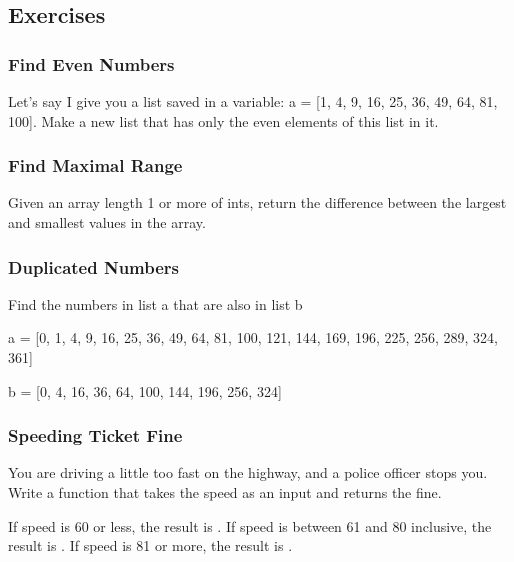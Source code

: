 \documentclass[letterpaper,10pt,english]{sphinxmanual}
\begin{document}
\begin{sphinxVerbatim}
\end{sphinxVerbatim}


\subsection{Exercises}
\label{\detokenize{content/Introduction_to_Programming:exercises}}

\subsubsection{Find Even Numbers}
\label{\detokenize{content/Introduction_to_Programming:find-even-numbers}}
Let’s say I give you a list saved in a variable: a = {[}1, 4, 9, 16, 25, 36, 49, 64, 81, 100{]}. Make a new list that has only the even elements of this list in it.


\subsubsection{Find Maximal Range}
\label{\detokenize{content/Introduction_to_Programming:find-maximal-range}}
Given an array length 1 or more of ints, return the difference between the largest and smallest values in the array.


\subsubsection{Duplicated Numbers}
\label{\detokenize{content/Introduction_to_Programming:duplicated-numbers}}
Find the numbers in list a that are also in list b

a = {[}0, 1, 4, 9, 16, 25, 36, 49, 64, 81, 100, 121, 144, 169, 196, 225, 256, 289, 324, 361{]}

b = {[}0, 4, 16, 36, 64, 100, 144, 196, 256, 324{]}


\subsubsection{Speeding Ticket Fine}
\label{\detokenize{content/Introduction_to_Programming:speeding-ticket-fine}}
You are driving a little too fast on the highway, and a police officer stops you. Write a function that takes the speed as an input and returns the fine.

If speed is 60 or less, the result is . If speed is between 61 and 80 inclusive, the result is . If speed is 81 or more, the result is .
\end{document}
